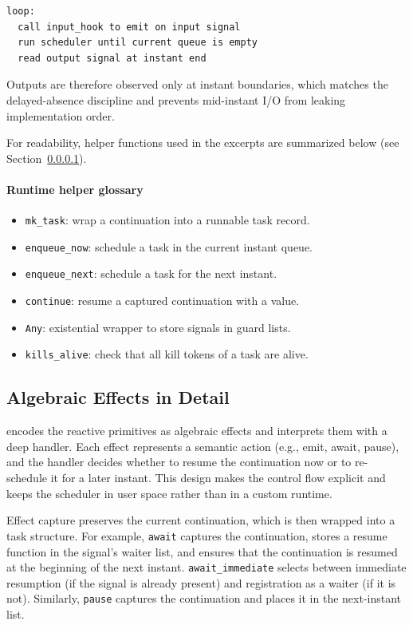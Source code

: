 \begin{lstlisting}[style=tempo]
loop:
  call input_hook to emit on input signal
  run scheduler until current queue is empty
  read output signal at instant end
\end{lstlisting}
Outputs are therefore observed only at instant boundaries, which matches the
delayed-absence discipline and prevents mid-instant I/O from leaking
implementation order.

For readability, helper functions used in the excerpts are summarized below
(see Section~\ref{sec:helper-glossary}).

\paragraph{Runtime helper glossary}\label{sec:helper-glossary}
\begin{itemize}
\item \texttt{mk\_task}: wrap a continuation into a runnable task record.
\item \texttt{enqueue\_now}: schedule a task in the current instant queue.
\item \texttt{enqueue\_next}: schedule a task for the next instant.
\item \texttt{continue}: resume a captured continuation with a value.
\item \texttt{Any}: existential wrapper to store signals in guard lists.
\item \texttt{kills\_alive}: check that all kill tokens of a task are alive.
\end{itemize}

\subsection{Algebraic Effects in Detail}
	\tempo{} encodes the reactive primitives as algebraic effects and interprets them
with a deep handler. Each effect represents a semantic action (e.g., emit,
await, pause), and the handler decides whether to resume the continuation now
or to re-schedule it for a later instant. This design makes the control flow
explicit and keeps the scheduler in user space rather than in a custom runtime.

Effect capture preserves the current continuation, which is then wrapped into a
task structure. For example, \texttt{await} captures the continuation, stores a
resume function in the signal's waiter list, and ensures that the continuation
is resumed at the beginning of the next instant. \texttt{await\_immediate}
selects between immediate resumption (if the signal is already present) and
registration as a waiter (if it is not). Similarly, \texttt{pause} captures the
continuation and places it in the next-instant list.

